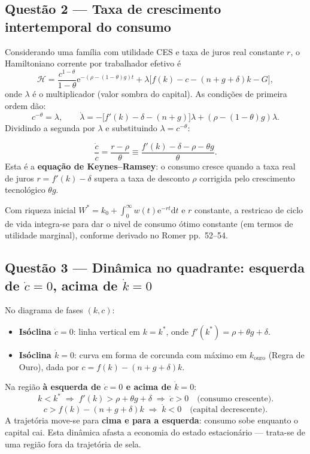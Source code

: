 \documentclass[11pt,a4paper]{article}
\newcommand{\dd}{\mathrm{d}}
\newcommand{\E}{\mathrm{e}}
\begin{document}
\subsection{Questão 2 --- Taxa de crescimento intertemporal do consumo}

Considerando uma fam\'ilia com utilidade CES e taxa de juros real constante $r$,
o Hamiltoniano corrente por trabalhador efetivo \'e
\[
  \mathcal{H} = \frac{c^{1-\theta}}{1-\theta}\E^{-(\rho-(1-\theta)g)t}
              + \lambda\bigl[f(k)-c-(n+g+\delta)k - G\bigr],
\]
onde $\lambda$ \'e o multiplicador (valor sombra do capital). As condi\c{c}\~oes
de primeira ordem d\~ao:
\[
  c^{-\theta} = \lambda, \qquad
  \dot\lambda = -\bigl[f'(k)-\delta-(n+g)\bigr]\lambda + (\rho - (1-\theta)g)\lambda.
\]
Dividindo a segunda por $\lambda$ e substituindo $\lambda = c^{-\theta}$:
\begin{resultado}
\[
  \frac{\dot c}{c} = \frac{r - \rho}{\theta}
  \equiv \frac{f'(k) - \delta - \rho - \theta g}{\theta}.
\]
Esta \'e a \textbf{equa\c{c}\~ao de Keynes--Ramsey}: o consumo cresce quando
a taxa real de juros $r = f'(k)-\delta$ supera a taxa de desconto $\rho$
corrigida pelo crescimento tecnol\'ogico $\theta g$.
\end{resultado}

Com riqueza inicial $W^* = k_0 + \int_0^\infty w(t)\E^{-rt}\dd t$ e $r$
constante, a restricao de ciclo de vida integra-se para dar o nivel de consumo
\'otimo constante (em termos de utilidade marginal), conforme derivado no
Romer pp.~52--54.

\subsection{Questão 3 --- Dinâmica no quadrante: esquerda de \(\dot c=0\), acima de \(\dot k=0\)}

No diagrama de fases $(k,c)$:
\begin{itemize}
  \item \textbf{Is\'oclina $\dot c = 0$}: linha vertical em $k = k^*$, onde
    $f'(k^*) = \rho + \theta g + \delta$.
  \item \textbf{Is\'oclina $\dot k = 0$}: curva em forma de corcunda com m\'aximo
    em $k_{\text{ouro}}$ (Regra de Ouro), dada por $c = f(k)-(n+g+\delta)k$.
\end{itemize}

\medskip
Na regi\~ao \textbf{\`a esquerda de $\dot c = 0$ e acima de $\dot k = 0$}:
\[
  k < k^*
  \;\Longrightarrow\; f'(k) > \rho + \theta g + \delta
  \;\Longrightarrow\; \dot c > 0 \quad\text{(consumo crescente)}.
\]
\[
  c > f(k)-(n+g+\delta)k
  \;\Longrightarrow\; \dot k < 0 \quad\text{(capital decrescente)}.
\]
A trajet\'oria move-se para \textbf{cima e para a esquerda}: consumo sobe
enquanto o capital cai. Esta din\^amica afasta a economia do estado estacion\'ario
--- trata-se de uma regi\~ao fora da trajet\'oria de sela.
\end{document}
